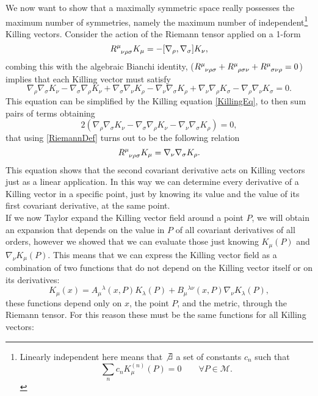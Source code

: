 We now want to show that a maximally symmetric space really possesses the maximum number of symmetries, namely the maximum number of independent\footnote{Linearly independent here means that $\not\exists$ a set of constants $c_n$ such that $$\sum_n c_n K_\mu^{(n)}(P)=0 \qquad \forall P\in\mathcal{M}.$$} Killing vectors.
Consider the action of the Riemann tensor applied on a 1-form
\begin{equation}
    \tensor{R}{^{\mu}_{\nu\rho\sigma}}K_\mu=-[\nabla_\rho,\nabla_\sigma]K_\nu,\label{RiemannDef}
\end{equation}
combing this with the algebraic Bianchi identity, ($\tensor{R}{^\mu_\nu_\rho_\sigma}+\tensor{R}{^\mu_\rho_\sigma_\nu}
+\tensor{R}{^\mu_\sigma_\nu_\rho}=0 $) implies that each Killing vector must satisfy
$$\nabla_\rho\nabla_\sigma K_\nu-\nabla_\sigma\nabla_\rho K_\nu +\nabla_\sigma\nabla_\nu K_\rho-\nabla_\nu\nabla_\sigma K_\rho+\nabla_\nu\nabla_\rho K_\sigma-\nabla_\rho\nabla_\nu K_\sigma=0.$$
This equation can be simplified by the Killing equation \eqref{KillingEq}, to then sum pairs of terms obtaining $$ 2(\nabla_\rho\nabla_\sigma K_\nu-\nabla_\sigma\nabla_\rho K_\nu -\nabla_\nu\nabla_\sigma K_\rho)=0,$$ that using \eqref{RiemannDef} turns out to be the following relation
\begin{equation}
    \tensor{R}{^\mu_{\nu\rho\sigma}}K_\mu=\nabla_\nu\nabla_\sigma K_\rho. \label{RNabla}
\end{equation}
This equation shows that the second covariant derivative acts on Killing vectors just as a linear application. In this way we can determine every derivative of a Killing vector in a specific point, just by knowing its value and the value of its first covariant derivative, at the same point.\\
If we now Taylor expand the Killing vector field around a point $P$, we will obtain an expansion that depends on the value in $P$ of all covariant derivatives of all orders, however we showed that we can evaluate those just knowing $K_\mu(P)$ and $\nabla_\nu K_\mu(P)$. This means that we can express the Killing vector field as a combination of two functions that do not depend on the Killing vector itself or on its derivatives:
\begin{equation*}
    K_\mu(x)=A_\mu\phantom{}^\lambda(x,P)K_\lambda(P)+B_\mu\phantom{}^{\lambda\nu}(x,P)\nabla_\nu K_\lambda(P),
\end{equation*}
these functions depend only on $x$, the point $P$, and the metric, through the Riemann tensor. For this reason these must be the same functions for all Killing vectors:
